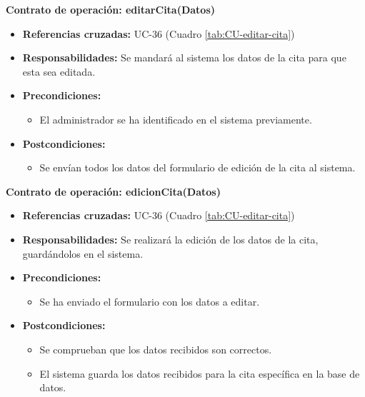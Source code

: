 \textbf{Contrato de operación: editarCita(Datos)}
\begin{itemize}
\item \textbf{Referencias cruzadas:} UC-36 (Cuadro \ref{tab:CU-editar-cita})
\item \textbf{Responsabilidades:} Se mandará al sistema los datos de la cita para que esta sea editada.
\item \textbf{Precondiciones:} 
 \begin{itemize}
\item El administrador se ha identificado en el sistema previamente.
\end {itemize}
\item \textbf{Postcondiciones:} 
 \begin{itemize}
\item Se envían todos los datos del formulario de edición de la cita al sistema.
\end {itemize}
\end {itemize}

\textbf{Contrato de operación: edicionCita(Datos)}
\begin{itemize}
\item \textbf{Referencias cruzadas:} UC-36 (Cuadro \ref{tab:CU-editar-cita})
\item \textbf{Responsabilidades:} Se realizará la edición de los datos de la cita, guardándolos en el sistema.
\item \textbf{Precondiciones:} 
 \begin{itemize}
\item Se ha enviado el formulario con los datos a editar.
\end {itemize}
\item \textbf{Postcondiciones:} 
 \begin{itemize}
 \item Se comprueban que los datos recibidos son correctos.
\item El sistema guarda los datos recibidos para la cita específica en la base de datos.
\end {itemize}
\end {itemize}

